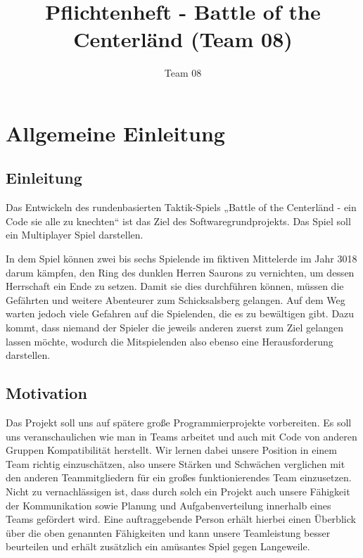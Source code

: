 \documentclass{uulm-assignment}
\title{Pflichtenheft - Battle of the Centerländ (Team 08)}
\author{Team 08}
\begin{document}
    \maketitle
    
    
    
    \tableofcontents
    
    \newpage
    

    \section{Allgemeine Einleitung}

    \subsection{Einleitung}
     Das Entwickeln des rundenbasierten Taktik-Spiels „Battle of the Centerländ - ein Code sie alle zu knechten“ ist das Ziel des Softwaregrundprojekts. Das Spiel soll ein Multiplayer Spiel darstellen.\

In dem Spiel können zwei bis sechs Spielende im fiktiven Mittelerde im Jahr 3018 darum kämpfen, den Ring des dunklen Herren Saurons zu vernichten, um dessen Herrschaft ein Ende zu setzen. Damit sie dies durchführen können, müssen die Gefährten und weitere Abenteurer zum Schicksalsberg gelangen. Auf dem Weg warten jedoch viele Gefahren auf die Spielenden, die es zu bewältigen gibt. Dazu kommt, dass niemand der Spieler die jeweils anderen zuerst zum Ziel gelangen lassen möchte, wodurch die Mitspielenden also ebenso eine Herausforderung darstellen.
    
    \subsection{Motivation}
    Das Projekt soll uns auf spätere große Programmierprojekte vorbereiten. Es soll uns veranschaulichen wie man in Teams arbeitet und auch mit Code von anderen Gruppen Kompatibilität herstellt. Wir lernen dabei unsere Position in einem Team richtig einzuschätzen, also unsere Stärken und Schwächen verglichen mit den anderen Teammitgliedern für ein großes funktionierendes Team einzusetzen. Nicht zu vernachlässigen ist, dass durch solch ein Projekt auch unsere Fähigkeit der Kommunikation sowie Planung und Aufgabenverteilung innerhalb eines Teams gefördert wird.
Eine auftraggebende Person erhält hierbei einen Überblick über die oben genannten Fähigkeiten und kann unsere Teamleistung besser beurteilen und erhält zusätzlich ein amüsantes Spiel gegen Langeweile.
\end{document}
